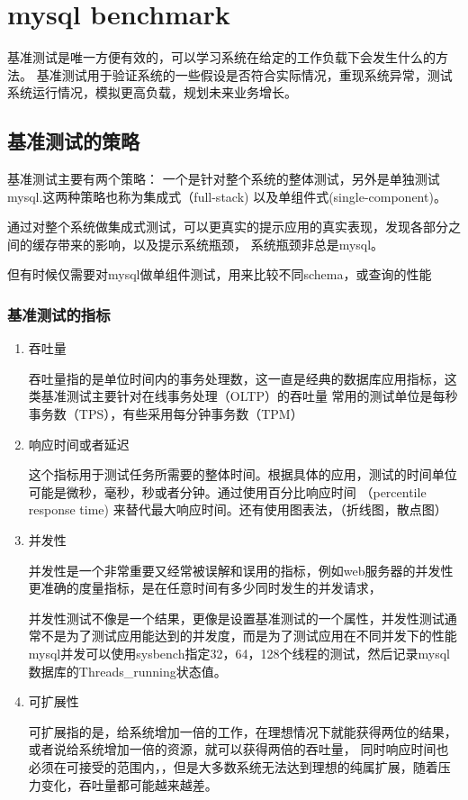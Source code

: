 \chapter{mysql benchmark}
基准测试是唯一方便有效的，可以学习系统在给定的工作负载下会发生什么的方法。
基准测试用于验证系统的一些假设是否符合实际情况，重现系统异常，测试系统运行情况，模拟更高负载，规划未来业务增长。


\section{基准测试的策略}
基准测试主要有两个策略： 一个是针对整个系统的整体测试，另外是单独测试mysql.这两种策略也称为集成式（full-stack)
以及单组件式(single-component)。

通过对整个系统做集成式测试，可以更真实的提示应用的真实表现，发现各部分之间的缓存带来的影响，以及提示系统瓶颈，
系统瓶颈非总是mysql。

但有时候仅需要对mysql做单组件测试，用来比较不同schema，或查询的性能

\subsection{基准测试的指标}



\begin{enumerate}

\item 吞吐量

吞吐量指的是单位时间内的事务处理数，这一直是经典的数据库应用指标，这类基准测试主要针对在线事务处理（OLTP）的吞吐量
常用的测试单位是每秒事务数（TPS），有些采用每分钟事务数（TPM）

\item 响应时间或者延迟

这个指标用于测试任务所需要的整体时间。根据具体的应用，测试的时间单位可能是微秒，毫秒，秒或者分钟。通过使用百分比响应时间
（percentile response time) 来替代最大响应时间。还有使用图表法，（折线图，散点图）

\item 并发性

并发性是一个非常重要又经常被误解和误用的指标，例如web服务器的并发性更准确的度量指标，是在任意时间有多少同时发生的并发请求，

并发性测试不像是一个结果，更像是设置基准测试的一个属性，并发性测试通常不是为了测试应用能达到的并发度，而是为了测试应用在不同并发下的性能
mysql并发可以使用sysbench指定32，64，128个线程的测试，然后记录mysql数据库的Threads_running状态值。

\item 可扩展性

可扩展指的是，给系统增加一倍的工作，在理想情况下就能获得两位的结果，或者说给系统增加一倍的资源，就可以获得两倍的吞吐量，
同时响应时间也必须在可接受的范围内，，但是大多数系统无法达到理想的纯属扩展，随着压力变化，吞吐量都可能越来越差。
\end{enumerate}

